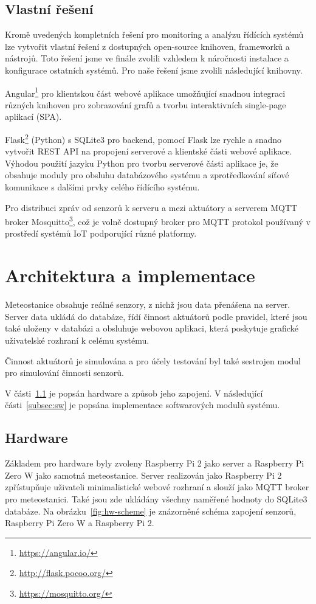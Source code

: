 \documentclass[11pt,a4paper]{article}
\begin{document}
\subsection{Vlastní řešení}
Kromě uvedených kompletních řešení pro monitoring a analýzu řídících systémů lze vytvořit vlastní řešení z dostupných open-source knihoven, frameworků a nástrojů. Toto řešení jsme ve finále zvolili vzhledem k náročnosti instalace a konfigurace ostatních systémů. Pro naše řešení jsme zvolili následující knihovny.

Angular\footnote{\url{https://angular.io/}} pro klientskou část webové aplikace umožňující snadnou integraci různých knihoven pro zobrazování grafů a tvorbu interaktivních single-page aplikací (SPA).

Flask\footnote{\url{http://flask.pocoo.org/}} (Python) s SQLite3 pro backend, pomocí Flask lze rychle a snadno vytvořit REST API na propojení serverové a klientské části webové aplikace. Výhodou použití jazyku Python pro tvorbu serverové části aplikace je, že obsahuje moduly pro obsluhu databázového systému a zprotředkování síťové komunikace s dalšími prvky celého řídícího systému.

Pro distribuci zpráv od senzorů k serveru a mezi aktuátory a serverem MQTT broker Mosquitto\footnote{\url{https://mosquitto.org/}}, což je volně dostupný broker pro MQTT protokol používaný v prostředí systémů IoT podporující různé platformy.

\section{Architektura a implementace}
Meteostanice obsahuje reálné senzory, z nichž jsou data přenášena na server. Server data ukládá do databáze, řídí činnost aktuátorů podle pravidel, které jsou také uloženy v databázi a obsluhuje webovou aplikaci, která poskytuje grafické uživatelské rozhraní k celému systému.

Činnost aktuátorů je simulována a pro účely testování byl také sestrojen modul pro simulování činnosti senzorů.

V části~\ref{subsec:hw} je popsán hardware a způsob jeho zapojení. V následující části~\ref{subsec:sw} je popsána implementace softwarových modulů systému.

\subsection{Hardware}\label{subsec:hw}
Základem pro hardware byly zvoleny Raspberry Pi 2 jako server a Raspberry Pi Zero W jako samotná meteostanice. Server realizován jako Raspberry Pi 2 zpřístupňuje uživateli minimalistické webové rozhraní a slouží jako MQTT broker pro meteostanici. Také jsou zde ukládány všechny naměřené hodnoty do SQLite3 databáze.
Na obrázku~\ref{fig:hw-scheme} je znázorněné schéma zapojení senzorů, Raspberry Pi Zero W a Raspberry Pi 2.
\end{document}
